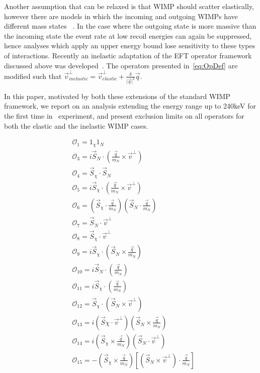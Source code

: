 	    Another assumption that can be relaxed is that WIMP should scatter elastically, however there are models in which the incoming and outgoing WIMPs have different mass states ~\cite{InelasticIntro}. In the case where the outgoing state is more massive than the incoming state the event rate at low recoil energies can again be suppressed, hence analyses which apply an upper energy bound lose sensitivity to these types of interactions. Recently an inelastic adaptation of the EFT operator framework discussed above was developed~\cite{InelasticMath}. The operators presented in~\ref{eq:OpDef} are modified such that $\vec{v}^\perp_{inelastic} = \vec{v}^\perp_{elastic} +\frac{\delta}{\vert{\vec{q}}\vert^2}\vec{q}$.      
	    
	    In this paper, motivated by both these extensions of the standard WIMP framework, we report on an analysis extending the energy range up to 240keV for the first time in \Xehund\ experiment, and present exclusion limits on all operators for both the elastic and the inelastic WIMP cases.     

\begin{equation} \label{eq:OpDef}
\begin{split}
&\mathcal{O}_1 = 1_{\chi} 1_N  \\
&\mathcal{O}_3 = i\vec{S}_N\cdot (\frac{\vec{q}}{m_N}\times\vec{v}^\perp) \\
&\mathcal{O}_4 = \vec{S}_{\chi}\cdot \vec{S}_N \\
&\mathcal{O}_5 = i\vec{S}_{\chi}\cdot (\frac{\vec{q}}{m_N}\times\vec{v}^\perp) \\
&\mathcal{O}_6 = (\vec{S}_{\chi} \cdot \frac{\vec{q}}{m_N})(\vec{S}_N \cdot \frac{\vec{q}}{m_N}) \\
&\mathcal{O}_7 = \vec{S}_N \cdot \vec{v}^\perp \\
&\mathcal{O}_8 = \vec{S}_{\chi} \cdot \vec{v}^\perp \\
&\mathcal{O}_9 = i\vec{S}_{\chi} \cdot(\vec{S}_N \times \frac{\vec{q}}{m_N}) \\
&\mathcal{O}_{10} = i\vec{S}_N \cdot (\frac{\vec{q}}{m_N}) \\
&\mathcal{O}_{11} = i\vec{S}_{\chi} \cdot (\frac{\vec{q}}{m_N}) \\
&\mathcal{O}_{12} = \vec{S}_\chi \cdot (\vec{S}_N \times \vec{v}^\perp) \\
&\mathcal{O}_{13} = i(\vec{S}\chi \cdot \vec{v}^\perp)(\vec{S}_N \times \frac{\vec{q}}{m_N})\\
&\mathcal{O}_{14} = i(\vec{S}_\chi \times \frac{\vec{q}}{m_N})(\vec{S}_N \cdot \vec{v}^\perp) \\
&\mathcal{O}_{15} = -(\vec{S}_\chi \times \frac{\vec{q}}{m_N})[(\vec{S}_N \times \vec{v}^\perp)\cdot \frac{\vec{q}}{m_N}]
\end{split}
\end{equation}

